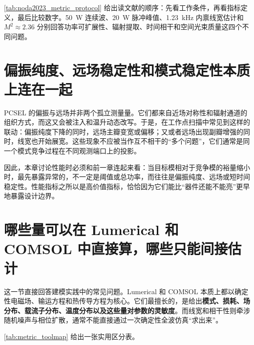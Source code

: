 \cref{tab:noda2023_metric_protocol} 给出读文献的顺序：先看工作条件，再看指标定义，最后比较数字。\SI{50}{W} 连续波、\SI{20}{W} 脉冲峰值、\SI{1.23}{kHz} 内禀线宽估计和 $M^2\approx2.36$ 分别回答功率可扩展性、辐射提取、时间相干和空间光束质量这四个不同问题。

\section{偏振纯度、远场稳定性和模式稳定性本质上连在一起}
PCSEL 的偏振与远场并非两个孤立测量量。它们都来自近场对称性和辐射通道的组织方式，而这又会被注入和温升动态改写。于是，在工作点扫描中常见到这样的联动：偏振纯度下降的同时，远场主瓣变宽或偏移；又或者远场出现副瓣增强的同时，线宽也开始展宽。这些现象不应被当作互不相干的“多个问题”，它们通常是同一个模式竞争过程在不同观测端口上的投影。

因此，本章讨论性能时必须和前一章连起来看：当目标模相对于竞争模的裕量缩小时，最先暴露异常的，不一定是阈值或总功率，而往往是偏振纯度、远场或短时间稳定性。性能指标之所以是高价值指标，恰恰因为它们能比“器件还能不能亮”更早地暴露设计边界。

\section[直接与间接可计算量]{哪些量可以在 Lumerical 和 COMSOL 中直接算，哪些只能间接估计}
这一节直接回答建模实践中的常见问题。Lumerical 和 COMSOL 本质上都以确定性电磁场、输运方程和热传导方程为核心。它们最擅长的，是给出\textbf{模式、损耗、场分布、载流子分布、温度分布以及这些量对参数的灵敏度}。而线宽和相干性则牵涉随机噪声与相位扩散，通常不能直接通过一次确定性全波仿真“求出来”。

\cref{tab:metric_toolmap} 给出一张实用区分表。

